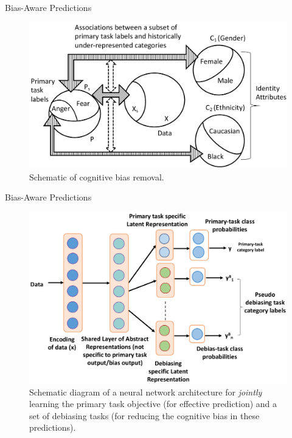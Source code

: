 \documentclass{beamer}
\begin{document}
%
\begin{frame}{Bias-Aware Predictions}
%
\begin{figure}[t]
    \centering
    \includegraphics[width=.8\columnwidth]{bias-schematic.pdf}
    \caption{Schematic of cognitive bias removal.}
    \label{fig:schematic-bias}
\end{figure}
\end{frame}
%
\begin{frame}{Bias-Aware Predictions}
%
\begin{figure}[t]
    \centering
    \includegraphics[width=.85\columnwidth]{debias-architecture.pdf}
    \caption{Schematic diagram of a neural network architecture for \emph{jointly} learning the primary task objective (for effective prediction) and a set of debiasing tasks (for reducing the cognitive bias in these predictions).}
\label{fig:deBiasArch}
\end{figure}
\end{frame}
%
\end{document}
